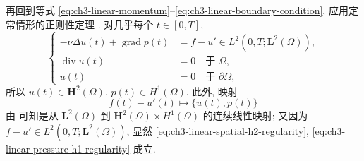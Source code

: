 \begin{Proof}
再回到等式 \eqref{eq:ch3-linear-momentum}--\eqref{eq:ch3-linear-boundary-condition}, 应用定常情形的正则性定理 . 对几乎每个 $t\in[0,T]$,
\begin{equation}
\left\{
\begin{aligned}
-\nu\Delta u(t)+\operatorname{grad}p(t)
&=f-u'\in L^2(0,T;\mathbf L^2(\Omega)),\\
\operatorname{div}u(t)&=0\quad\text{于 }\Omega,\\
u(t)&=0\quad\text{于 }\partial\Omega,
\end{aligned}
\right.
\label{eq:ch3-linear-stationary-regularity-system}
\end{equation}
所以 $u(t)\in\mathbf H^2(\Omega)$, $p(t)\in H^1(\Omega)$. 此外, 映射
\[
f(t)-u'(t)\longmapsto\{u(t),p(t)\}
\]
由  可知是从 $\mathbf L^2(\Omega)$ 到 $\mathbf H^2(\Omega)\times H^1(\Omega)$ 的连续线性映射; 又因为 $f-u'\in L^2(0,T;\mathbf L^2(\Omega))$, 显然 \eqref{eq:ch3-linear-spatial-h2-regularity}, \eqref{eq:ch3-linear-pressure-h1-regularity} 成立.
\end{Proof}


